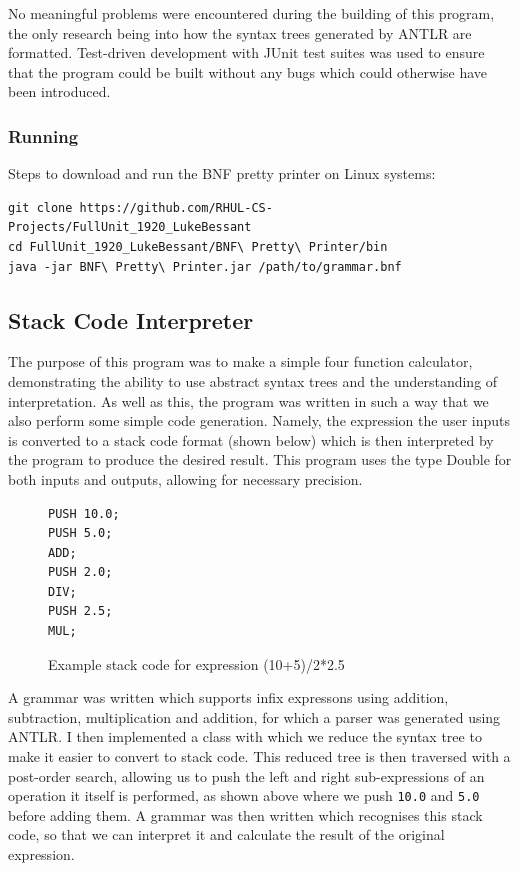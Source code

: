 \documentclass[a4paper, 11pt]{article}
\begin{document}
No meaningful problems were encountered during the building of this program, the only research being into how the syntax trees generated by ANTLR are formatted. Test-driven development with JUnit test suites was used to ensure that the program could be built without any bugs which could otherwise have been introduced.
\subsubsection{Running}
Steps to download and run the BNF pretty printer on Linux systems:
\begin{verbatim}
git clone https://github.com/RHUL-CS-Projects/FullUnit_1920_LukeBessant
cd FullUnit_1920_LukeBessant/BNF\ Pretty\ Printer/bin
java -jar BNF\ Pretty\ Printer.jar /path/to/grammar.bnf
\end{verbatim}

\subsection{Stack Code Interpreter}
The purpose of this program was to make a simple four function calculator, demonstrating the ability to use abstract syntax trees and the understanding of interpretation. As well as this, the program was written in such a way that we also perform some simple code generation. Namely, the expression the user inputs is converted to a stack code format (shown below) which is then interpreted by the program to produce the desired result. This program uses the type Double for both inputs and outputs, allowing for necessary precision.

\begin{figure}[H]
\centering
\begin{BVerbatim}
PUSH 10.0;
PUSH 5.0;
ADD;
PUSH 2.0;
DIV;
PUSH 2.5;
MUL;
\end{BVerbatim}
\caption{Example stack code for expression (10+5)/2*2.5}
\end{figure}

\noindent A grammar was written which supports infix expressons using addition, subtraction, multiplication and addition, for which a parser was generated using ANTLR. I then implemented a class with which we reduce the syntax tree to make it easier to convert to stack code. This reduced tree is then traversed with a post-order search, allowing us to push the left and right sub-expressions of an operation it itself is performed, as shown above where we push \texttt{10.0} and \texttt{5.0} before adding them. A grammar was then written which recognises this stack code, so that we can interpret it and calculate the result of the original expression. 
\end{document}
